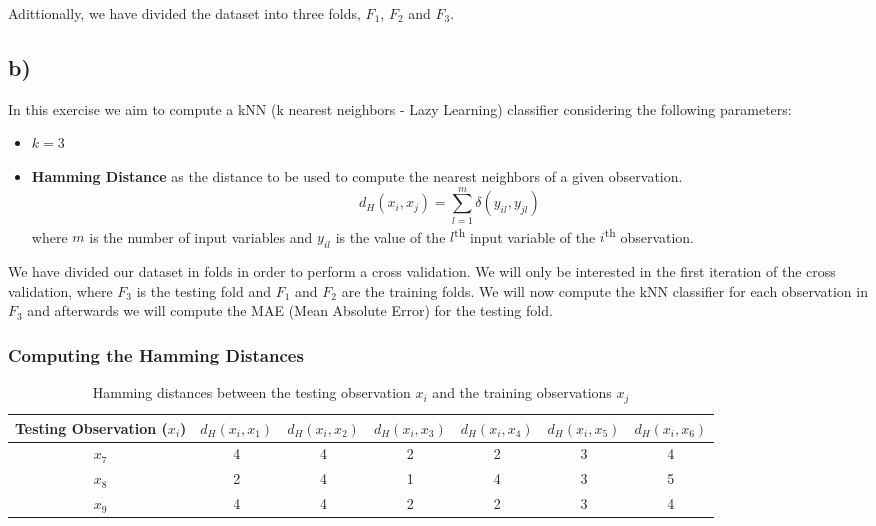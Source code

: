 \documentclass{article}
\begin{document}
Adittionally, we have divided the dataset into three folds, $F_1$, $F_2$ and $F_3$.

\subsection*{b)}

In this exercise we aim to compute a kNN (k  nearest neighbors - Lazy Learning) classifier considering the following parameters:

\begin{itemize}
  \item $k = 3$
  \item \textbf{Hamming Distance} as the distance to be used to compute the nearest neighbors of a given observation.
  \[ d_H(x_i,x_j) = \sum_{l=1}^{m} \delta(y_{il},y_{jl}) \]
  where $m$ is the number of input variables and $y_{il}$ is the value of the $l$\textsuperscript{th} input variable of the $i$\textsuperscript{th} observation.
\end{itemize}

We have divided our dataset in folds in order to perform a cross validation. We will only be interested in the first iteration of the cross validation, where $F_3$ is the testing fold and $F_1$ and $F_2$ are the training folds. 
We will now compute the kNN classifier for each observation in $F_3$ and afterwards we will compute the MAE (Mean Absolute Error) for the testing fold.

\subsubsection*{Computing the Hamming Distances}

\begin{table}[H]
\centering
\begin{tabular}{|c|c|c|c|c|c|c|}
  \hline
  Testing Observation ($x_i$) & $d_H(x_i,x_1)$ & $d_H(x_i,x_2)$ & $d_H(x_i,x_3)$ & $d_H(x_i,x_4)$ & $d_H(x_i,x_5)$ & $d_H(x_i,x_6)$ \\ \hline
  $x_7$                       & 4              & 4              & 2 \cellcolor{yellow!25}             & 2 \cellcolor{yellow!25}             & 3 \cellcolor{yellow!25}             & 4              \\ \hline
  $x_8$                       & 2 \cellcolor{yellow!25}             & 4              & 1 \cellcolor{yellow!25}             & 4              & 3 \cellcolor{yellow!25}             & 5              \\ \hline
  $x_9$                       & 4              & 4              & 2 \cellcolor{yellow!25}             & 2  \cellcolor{yellow!25}            & 3 \cellcolor{yellow!25}             & 4              \\ \hline
\end{tabular}
\caption{Hamming distances between the testing observation $x_i$ and the training observations $x_j$}
\label{tab:hamming_distances}
\end{table}
\end{document}
